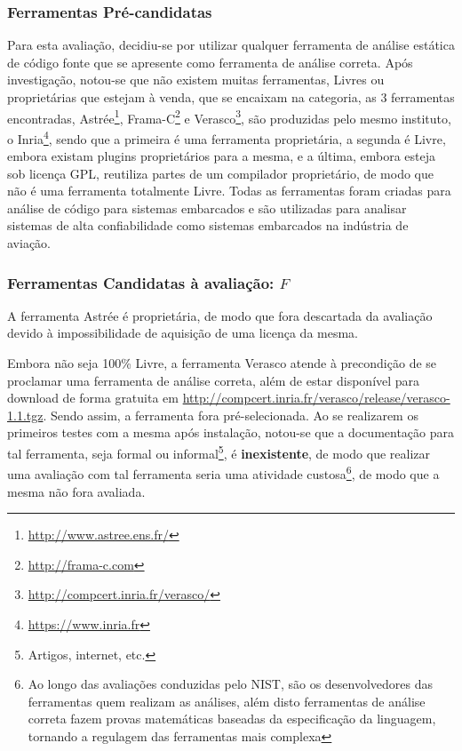 \subsubsection{Ferramentas Pré-candidatas}

Para esta avaliação, decidiu-se por utilizar qualquer ferramenta de análise estática de código fonte que se apresente como ferramenta de análise correta. Após investigação, notou-se que não existem muitas ferramentas, Livres ou proprietárias que estejam à venda, que se encaixam na categoria, as 3 ferramentas encontradas, Astrée\footnote{\url{http://www.astree.ens.fr/}}, Frama-C\footnote{\url{http://frama-c.com}} e Verasco\footnote{\url{http://compcert.inria.fr/verasco/}}, são produzidas pelo mesmo instituto, o Inria\footnote{\url{https://www.inria.fr}}, sendo que a primeira é uma ferramenta proprietária, a segunda é Livre, embora existam plugins proprietários para a mesma, e a última, embora esteja sob licença GPL, reutiliza partes de um compilador proprietário, de modo que não é uma ferramenta totalmente Livre. Todas as ferramentas foram criadas para análise de código para sistemas embarcados e são utilizadas para analisar sistemas de alta confiabilidade como sistemas embarcados na indústria de aviação.

\subsubsection{Ferramentas Candidatas à avaliação: $F$}

A ferramenta Astrée é proprietária, de modo que fora descartada da avaliação devido à impossibilidade de aquisição de uma licença da mesma.

Embora não seja 100\% Livre, a ferramenta Verasco atende à precondição de se proclamar uma ferramenta de análise correta, além de estar disponível para download de forma gratuita em \url{http://compcert.inria.fr/verasco/release/verasco-1.1.tgz}. Sendo assim, a ferramenta fora pré-selecionada. Ao se realizarem os primeiros testes com a mesma após instalação, notou-se que a documentação para tal ferramenta, seja formal ou informal\footnote{Artigos, internet, etc.}, é \textbf{inexistente}, de modo que realizar uma avaliação com tal ferramenta seria uma atividade custosa\footnote{Ao longo das avaliações conduzidas pelo NIST, são os desenvolvedores das ferramentas quem realizam as análises, além disto ferramentas de análise correta fazem provas matemáticas baseadas da especificação da linguagem, tornando a regulagem das ferramentas mais complexa}, de modo que a mesma não fora avaliada.

